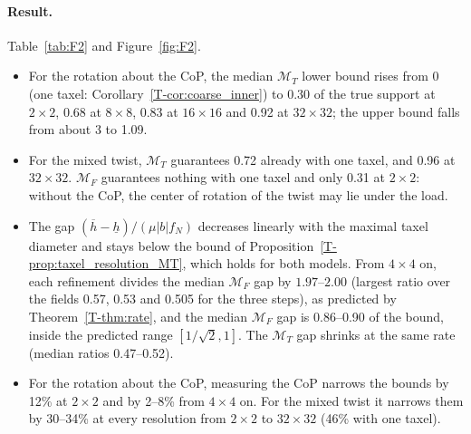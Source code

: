 \documentclass[11pt,a4paper]{article}
\newcommand{\M}{\mathcal M}
\newcommand{\T}[1]{\ref{T-#1}}                       %
\begin{document}
\paragraph{Result.} Table~\ref{tab:F2} and Figure~\ref{fig:F2}.
\begin{itemize}
    \item For the rotation about the CoP, the median $\M_T$ lower bound rises from 0 (one taxel: Corollary~\T{cor:coarse_inner}) to 0.30 of the true
    support at $2\times2$, 0.68 at $8\times8$, 0.83 at $16\times16$ and 0.92 at $32\times32$; the upper bound falls from about 3 to 1.09.
    \item For the mixed twist, $\M_T$ guarantees 0.72 already with one taxel, and 0.96 at $32\times32$. $\M_F$ guarantees nothing with one taxel and only
    0.31 at $2\times2$: without the CoP, the center of rotation of the twist may lie under the load.
    \item The gap $(\overline h-\underline h)/(\mu|b|f_N)$ decreases linearly with the maximal taxel diameter and stays below the bound of
    Proposition~\T{prop:taxel_resolution_MT}, which holds for both models. From $4\times4$ on, each refinement divides the median $\M_F$ gap by
    $1.97$--$2.00$ (largest ratio over the fields 0.57, 0.53 and 0.505 for the three steps), as predicted by Theorem~\T{thm:rate}, and the median $\M_F$ gap is
    0.86--0.90 of the bound, inside the predicted range $[1/\sqrt2,1]$. The $\M_T$ gap shrinks at the same rate (median ratios 0.47--0.52).
    \item For the rotation about the CoP, measuring the CoP narrows the bounds by 12\% at $2\times2$ and by 2--8\% from $4\times4$ on. For the mixed
    twist it narrows them by 30--34\% at every resolution from $2\times2$ to $32\times32$ (46\% with one taxel).
\end{itemize}
\end{document}
